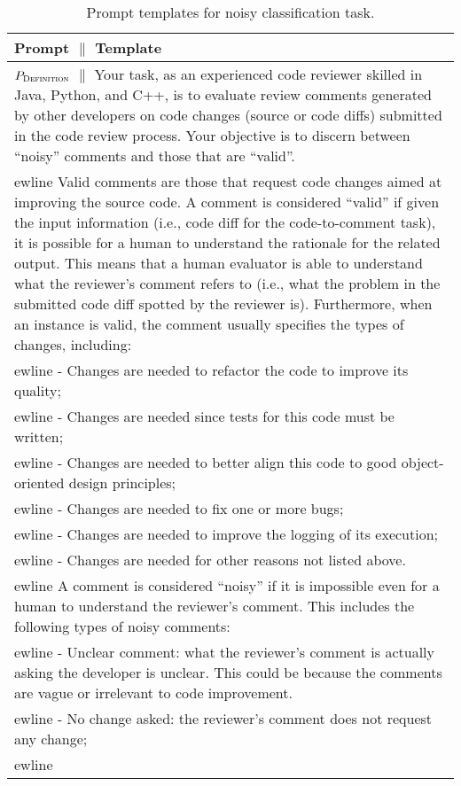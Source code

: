 
\begin{table*}[!t]
    \centering
    \small 
    \caption{Prompt templates for noisy classification task.}
    \label{tab:prompt_templates}
    \begin{tabular}{p{\textwidth}} %
        \textbf{Prompt} $\|$ \textbf{Template} \\
        \toprule
         \textbf{$P_{\textsc{Definition}}$} $\|$ Your task, as an experienced code reviewer skilled in Java, Python, and C++, is to evaluate review comments generated by other developers on code changes (source or code diffs) submitted in the code review process. Your objective is to discern between ``noisy'' comments and those that are ``valid''. \\ewline 
        Valid comments are those that request code changes aimed at improving the source code. A comment is considered ``valid'' if given the input information (i.e., code diff for the code-to-comment task), it is possible for a human to understand the rationale for the related output. This means that a human evaluator is able to understand what the reviewer's comment refers to (i.e., what the problem in the submitted code diff spotted by the reviewer is). Furthermore, when an instance is valid, the comment usually specifies the types of changes, including: \\ewline 
        - Changes are needed to refactor the code to improve its quality; \\ewline 
        - Changes are needed since tests for this code must be written; \\ewline 
        - Changes are needed to better align this code to good object-oriented design principles; \\ewline 
        - Changes are needed to fix one or more bugs; \\ewline 
        - Changes are needed to improve the logging of its execution; \\ewline 
        - Changes are needed for other reasons not listed above. \\ewline 
        A comment is considered ``noisy'' if it is impossible even for a human to understand the reviewer's comment. This includes the following types of noisy comments: \\ewline 
        - Unclear comment: what the reviewer's comment is actually asking the developer is unclear. This could be because the comments are vague or irrelevant to code improvement. \\ewline 
        - No change asked: the reviewer’s comment does not request any change; \\ewline 

\end{tabular}
\end{table*}
